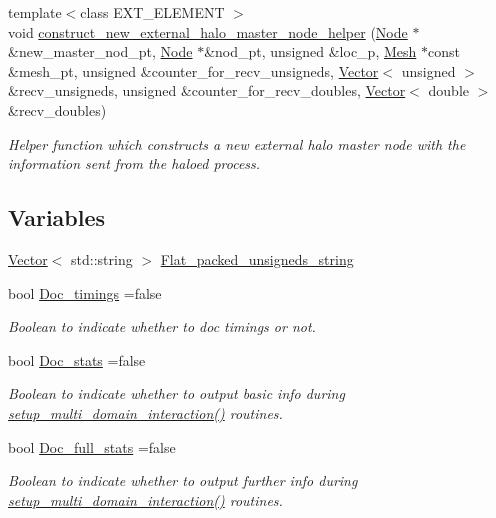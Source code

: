 \begin{DoxyCompactItemize}
{\footnotesize template$<$class E\+X\+T\+\_\+\+E\+L\+E\+M\+E\+NT $>$ }\\void \hyperlink{namespaceoomph_1_1Missing__masters__functions_a97561cb6cf8e5ad1c876173ee5973e41}{construct\+\_\+new\+\_\+external\+\_\+halo\+\_\+master\+\_\+node\+\_\+helper} (\hyperlink{classoomph_1_1Node}{Node} $\ast$\&new\+\_\+master\+\_\+nod\+\_\+pt, \hyperlink{classoomph_1_1Node}{Node} $\ast$\&nod\+\_\+pt, unsigned \&loc\+\_\+p, \hyperlink{classoomph_1_1Mesh}{Mesh} $\ast$const \&mesh\+\_\+pt, unsigned \&counter\+\_\+for\+\_\+recv\+\_\+unsigneds, \hyperlink{classoomph_1_1Vector}{Vector}$<$ unsigned $>$ \&recv\+\_\+unsigneds, unsigned \&counter\+\_\+for\+\_\+recv\+\_\+doubles, \hyperlink{classoomph_1_1Vector}{Vector}$<$ double $>$ \&recv\+\_\+doubles)
\begin{DoxyCompactList}\small\item\em Helper function which constructs a new external halo master node with the information sent from the haloed process. \end{DoxyCompactList}\end{DoxyCompactItemize}
\subsection*{Variables}
\begin{DoxyCompactItemize}
\item 
\hyperlink{classoomph_1_1Vector}{Vector}$<$ std\+::string $>$ \hyperlink{namespaceoomph_1_1Missing__masters__functions_af558db56295524af220b5b4c981d5aa0}{Flat\+\_\+packed\+\_\+unsigneds\+\_\+string}
\item 
bool \hyperlink{namespaceoomph_1_1Missing__masters__functions_acd9cae489a6217b1566a1e40cbca86cf}{Doc\+\_\+timings} =false
\begin{DoxyCompactList}\small\item\em Boolean to indicate whether to doc timings or not. \end{DoxyCompactList}\item 
bool \hyperlink{namespaceoomph_1_1Missing__masters__functions_a86ac04bf0028ba6e66c07466cc9774ce}{Doc\+\_\+stats} =false
\begin{DoxyCompactList}\small\item\em Boolean to indicate whether to output basic info during \hyperlink{namespaceoomph_1_1Multi__domain__functions_ac64183e03f173c69ed6ed6f493a1a67e}{setup\+\_\+multi\+\_\+domain\+\_\+interaction()} routines. \end{DoxyCompactList}\item 
bool \hyperlink{namespaceoomph_1_1Missing__masters__functions_a5059632b6254fcfc11f688e3e643d71c}{Doc\+\_\+full\+\_\+stats} =false
\begin{DoxyCompactList}\small\item\em Boolean to indicate whether to output further info during \hyperlink{namespaceoomph_1_1Multi__domain__functions_ac64183e03f173c69ed6ed6f493a1a67e}{setup\+\_\+multi\+\_\+domain\+\_\+interaction()} routines. \end{DoxyCompactList}\end{DoxyCompactItemize}


